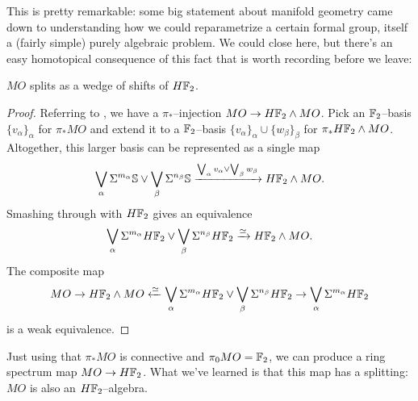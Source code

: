 This is pretty remarkable: some big statement about manifold geometry came down to understanding how we could reparametrize a certain formal group, itself a (fairly simple) purely algebraic problem.  We could close here, but there's an easy homotopical consequence of this fact that is worth recording before we leave:

\begin{lemma}
$MO$ splits as a wedge of shifts of $H\mathbb F_2$.
\end{lemma}
\begin{proof}
Referring to , we have a $\pi_*$--injection $MO \to H\mathbb F_2 \wedge MO$.  Pick an $\mathbb F_2$--basis $\{v_\alpha\}_\alpha$ for $\pi_* MO$ and extend it to a $\mathbb F_2$--basis $\{v_\alpha\}_\alpha \cup \{w_\beta\}_\beta$ for $\pi_* H\mathbb F_2 \wedge MO$.  Altogether, this larger basis can be represented as a single map \[\bigvee_\alpha \Sigma^{m_\alpha} \mathbb S \vee \bigvee_\beta \Sigma^{n_\beta} \mathbb S \xrightarrow{\bigvee_\alpha v_\alpha \vee \bigvee_\beta w_\beta} H\mathbb F_2 \wedge MO.\]  Smashing through with $H\mathbb F_2$ gives an equivalence \[\bigvee_\alpha \Sigma^{m_\alpha} H\mathbb F_2 \vee \bigvee_\beta \Sigma^{n_\beta} H\mathbb F_2 \xrightarrow\simeq H\mathbb F_2 \wedge MO.\]  The composite map \[MO \to H\mathbb F_2 \wedge MO \xleftarrow\simeq \bigvee_\alpha \Sigma^{m_\alpha} H\mathbb F_2 \vee \bigvee_\beta \Sigma^{n_\beta} H\mathbb F_2 \to \bigvee_\alpha \Sigma^{m_\alpha} H\mathbb F_2\] is a weak equivalence.
\end{proof}

\begin{remark}
Just using that $\pi_* MO$ is connective and $\pi_0 MO = \mathbb F_2$, we can produce a ring spectrum map $MO \to H\mathbb F_2$.  What we've learned is that this map has a splitting: $MO$ is also an $H\mathbb F_2$--algebra.
\end{remark}




